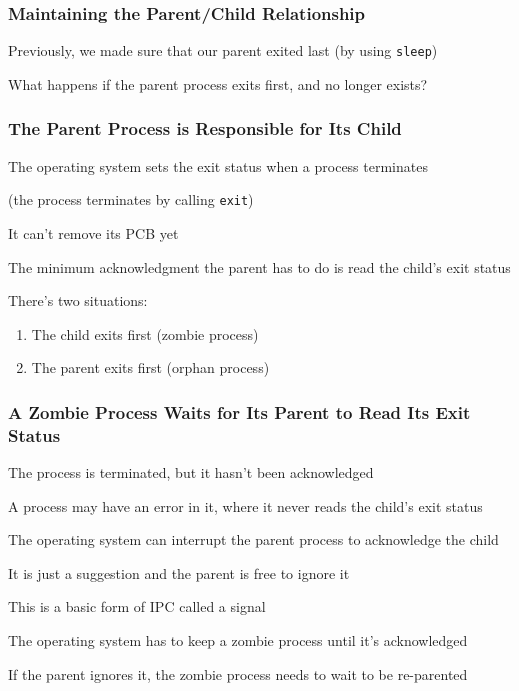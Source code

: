   \begin{frame}
    \frametitle{Maintaining the Parent/Child Relationship}

    Previously, we made sure that our parent exited last (by using \texttt{sleep})

    \vspace{2em}

    What happens if the parent process exits first, and no longer exists?
  \end{frame}

  \begin{frame}
    \frametitle{The Parent Process is Responsible for Its Child}

    The operating system sets the exit status when a process terminates
    
    (the process terminates by calling \texttt{exit})

    \hspace{2em} It can't remove its PCB yet

    \vspace{2em}

    The minimum acknowledgment the parent has to do is read the child's exit status

    \vspace{2em}

    There's two situations:
    \begin{enumerate}
      \item The child exits first (zombie process)
      \item The parent exits first (orphan process)
    \end{enumerate}
  \end{frame}

  \begin{frame}
    \frametitle{A Zombie Process Waits for Its Parent to Read Its Exit Status}

    The process is terminated, but it hasn't been acknowledged

    \vspace{2em}

    A process may have an error in it, where it never reads the child's exit status

    \vspace{2em}

    The operating system can interrupt the parent process to acknowledge the child

    \hspace{2em} It is just a suggestion and the parent is free to ignore it

    \hspace{4em} This is a basic form of IPC called a signal

    \vspace{4em}

    The operating system has to keep a zombie process until it's acknowledged

    \hspace{2em} If the parent ignores it, the zombie process needs to wait to
    be re-parented
  \end{frame}

